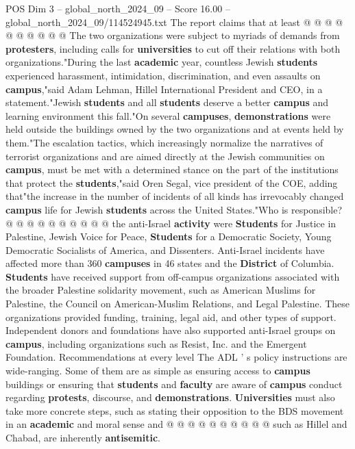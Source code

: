 \begin{textsample}{POS Dim 3 – global\_north\_2024\_09 – Score 16.00 – global\_north\_2024\_09/114524945.txt}
The report claims that at least @ @ @ @ @ @ @ @ @ @ The two organizations were subject to myriads of demands from \textbf{protesters}, including calls for \textbf{universities} to cut off their relations with both organizations."During the last \textbf{academic} year, countless Jewish \textbf{students} experienced harassment, intimidation, discrimination, and even assaults on \textbf{campus},"said Adam Lehman, Hillel International President and CEO, in a statement."Jewish \textbf{students} and all \textbf{students} deserve a better \textbf{campus} and learning environment this fall."On several \textbf{campuses}, \textbf{demonstrations} were held outside the buildings owned by the two organizations and at events held by them."The escalation tactics, which increasingly normalize the narratives of terrorist organizations and are aimed directly at the Jewish communities on \textbf{campus}, must be met with a determined stance on the part of the institutions that protect the \textbf{students},"said Oren Segal, vice president of the COE, adding that"the increase in the number of incidents of all kinds has irrevocably changed \textbf{campus} life for Jewish \textbf{students} across the United States."Who is responsible? @ @ @ @ @ @ @ @ @ @ the anti-Israel \textbf{activity} were \textbf{Students} for Justice in Palestine, Jewish Voice for Peace, \textbf{Students} for a Democratic Society, Young Democratic Socialists of America, and Dissenters.
Anti-Israel incidents have affected more than 360 \textbf{campuses} in 46 states and the \textbf{District} of Columbia. \textbf{Students} have received support from off-campus organizations associated with the broader Palestine solidarity movement, such as American Muslims for Palestine, the Council on American-Muslim Relations, and Legal Palestine.
These organizations provided funding, training, legal aid, and other types of support.
Independent donors and foundations have also supported anti-Israel groups on \textbf{campus}, including organizations such as Resist, Inc. and the Emergent Foundation.
Recommendations at every level The ADL ' s policy instructions are wide-ranging.
Some of them are as simple as ensuring access to \textbf{campus} buildings or ensuring that \textbf{students} and \textbf{faculty} are aware of \textbf{campus} conduct regarding \textbf{protests}, discourse, and \textbf{demonstrations}. \textbf{Universities} must also take more concrete steps, such as stating their opposition to the BDS movement in an \textbf{academic} and moral sense and @ @ @ @ @ @ @ @ @ @ such as Hillel and Chabad, are inherently \textbf{antisemitic}.

\end{textsample}

